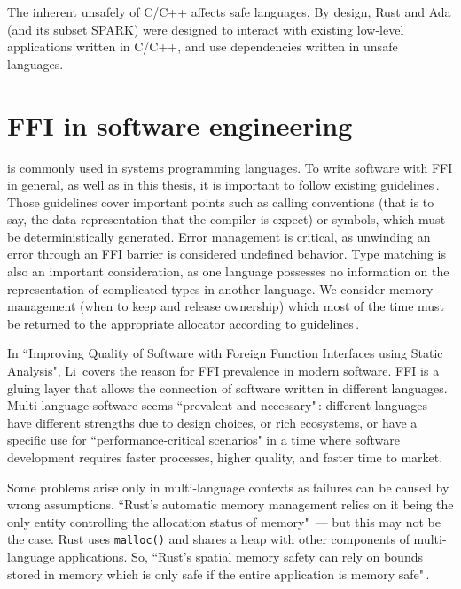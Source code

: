 \documentclass[nomenclature, english, bibtex]{kththesis}
\begin{document}
The inherent unsafely of C/C++ affects safe languages. By design, Rust and Ada (and its subset SPARK) were designed to interact with existing low-level applications written in C/C++, and use dependencies written in unsafe languages. 

\section[FFI in software engineering]{FFI in software engineering}

 is commonly used in systems programming languages. 
To write software with FFI in general, as well as in this thesis, it is important to follow existing guidelines\,\cite{gjengset_rust_2021, noauthor_ffi_nodate, noauthor_multi-language_nodate}. 
Those guidelines cover important points such as calling conventions (that is to say, the data representation that the compiler is expect) or symbols, which must be deterministically generated. Error management is critical, as unwinding an error through an FFI barrier is considered undefined behavior. Type matching is also an important consideration, as one language possesses no information on the representation of complicated types in another language. We consider memory management (when to keep and release ownership) which most of the time must be returned to the appropriate allocator according to guidelines\,\cite{gjengset_rust_2021}. 

In ``Improving Quality of Software with Foreign Function Interfaces using Static Analysis", Li\,\cite{li_improving_2014} covers the reason for FFI prevalence in modern software. FFI is a gluing layer that allows the connection of software written in different languages. Multi-language software seems ``prevalent and necessary"\,\cite{li_detecting_2022}: different languages have different strengths due to design choices, or rich ecosystems, or have a specific use for ``performance-critical scenarios" in a time where software development requires faster processes, higher quality, and faster time to market.

Some problems arise only in multi-language contexts as failures can be caused by wrong assumptions. ``Rust’s automatic memory management relies on it being the only entity controlling the allocation status of memory"\,\cite{mergendahl_cross-language_2022} --- but this may not be the case. Rust uses \texttt{malloc()} and shares a heap with other components of multi-language applications. So, ``Rust’s spatial memory safety can rely on bounds stored in memory which is only safe if the entire application is memory safe"\,\cite{mergendahl_cross-language_2022}.
\end{document}
